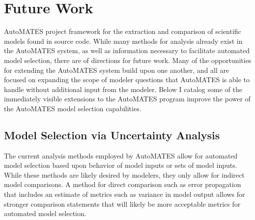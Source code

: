\section{Future Work\label{sec:future_work}}
 AutoMATES project 
framework for the extraction and comparison of scientific models found in source code. 
While many methods for analysis already exist in the AutoMATES system, as well as information necessary to facilitate automated model selection, there are  %
of directions for future work. 
Many of the opportunities for extending the AutoMATES system build upon one another, and all are focused on expanding the scope of modeler questions that AutoMATES is able to handle without additional input from the modeler. 
Below I catalog some of the immediately visible extensions to the AutoMATES program improve the power of the AutoMATES model selection capabilities.

%

\subsection{Model Selection via Uncertainty Analysis \label{auto_uncert_analysis}}
The current analysis methods employed by AutoMATES allow for automated model selection based upon behavior of model inputs or sets of model inputs. While these methods are likely desired by modelers, they only allow for indirect model comparisons. A method for direct comparison such as error propagation that includes an estimate of metrics such as variance in model output allows for stronger comparison statements that will likely be more acceptable metrics for automated model selection.

